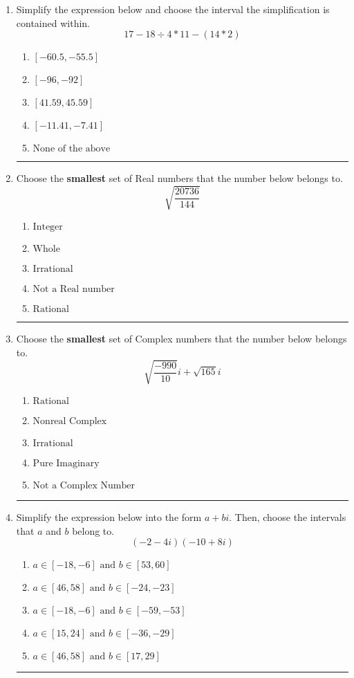 \documentclass[14pt]{extbook}
\newcommand{\litem}[1]{\item#1\hspace*{-1cm}\rule{\textwidth}{0.4pt}}
\begin{document}
\begin{enumerate}
{\begin{enumerate}[label=\Alph*.]
\end{enumerate} }
\litem{
Simplify the expression below and choose the interval the simplification is contained within.\[ 17 - 18 \div 4 * 11 - (14 * 2) \]\begin{enumerate}[label=\Alph*.]
\item \( [-60.5, -55.5] \)
\item \( [-96, -92] \)
\item \( [41.59, 45.59] \)
\item \( [-11.41, -7.41] \)
\item \( \text{None of the above} \)

\end{enumerate} }
\litem{
Choose the \textbf{smallest} set of Real numbers that the number below belongs to.\[ \sqrt{\frac{20736}{144}} \]\begin{enumerate}[label=\Alph*.]
\item \( \text{Integer} \)
\item \( \text{Whole} \)
\item \( \text{Irrational} \)
\item \( \text{Not a Real number} \)
\item \( \text{Rational} \)

\end{enumerate} }
\litem{
Choose the \textbf{smallest} set of Complex numbers that the number below belongs to.\[ \sqrt{\frac{-990}{10}} i+\sqrt{165}i \]\begin{enumerate}[label=\Alph*.]
\item \( \text{Rational} \)
\item \( \text{Nonreal Complex} \)
\item \( \text{Irrational} \)
\item \( \text{Pure Imaginary} \)
\item \( \text{Not a Complex Number} \)

\end{enumerate} }
\litem{
Simplify the expression below into the form $a+bi$. Then, choose the intervals that $a$ and $b$ belong to.\[ (-2 - 4 i)(-10 + 8 i) \]\begin{enumerate}[label=\Alph*.]
\item \( a \in [-18, -6] \text{ and } b \in [53, 60] \)
\item \( a \in [46, 58] \text{ and } b \in [-24, -23] \)
\item \( a \in [-18, -6] \text{ and } b \in [-59, -53] \)
\item \( a \in [15, 24] \text{ and } b \in [-36, -29] \)
\item \( a \in [46, 58] \text{ and } b \in [17, 29] \)


\end{enumerate}}
\end{enumerate}
\end{document}

